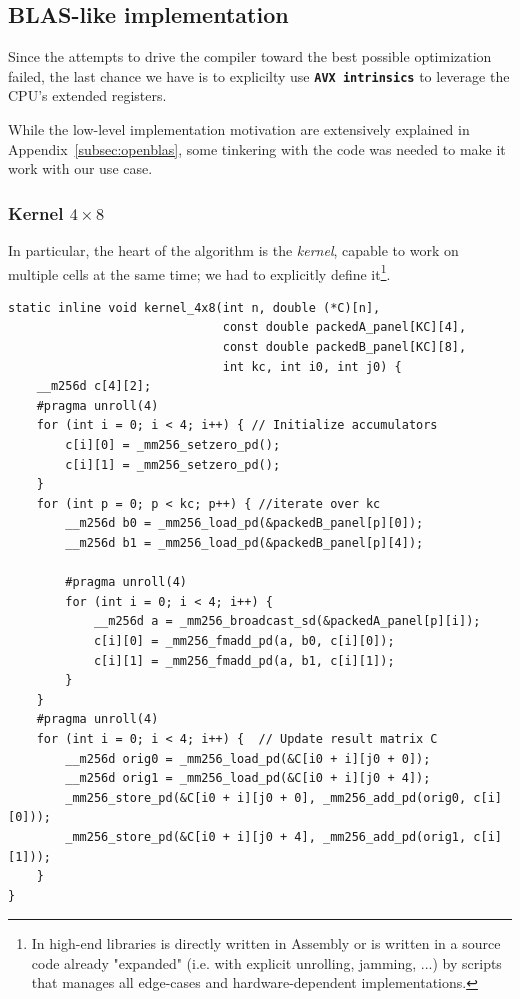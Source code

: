 \subsection{BLAS-like implementation}
Since the attempts to drive the compiler toward the best possible optimization failed, the last chance we have is to explicilty use \texttt{\textbf{AVX intrinsics}} to leverage the CPU's extended registers.

While the low-level implementation motivation are extensively explained in Appendix~\ref{subsec:openblas}, some tinkering with the code was needed to make it work with our use case. 

\subsubsection{Kernel $4\times8$}
In particular, the heart of the  algorithm is the \emph{kernel}, capable to work on multiple cells at the same time; we had to explicitly define it\footnote{In high-end libraries is directly written in Assembly or is written in a source code already "expanded" (i.e. with explicit unrolling, jamming, ...) by scripts that manages all edge-cases and hardware-dependent implementations.}.

\begin{lstlisting}[style=CStyle, caption={Kernel $4\times8$ doubles implementation},label={blas_like_code}]
static inline void kernel_4x8(int n, double (*C)[n], 
                              const double packedA_panel[KC][4], 
                              const double packedB_panel[KC][8], 
                              int kc, int i0, int j0) {
    __m256d c[4][2]; 
    #pragma unroll(4)
    for (int i = 0; i < 4; i++) { // Initialize accumulators
        c[i][0] = _mm256_setzero_pd();
        c[i][1] = _mm256_setzero_pd();
    }
    for (int p = 0; p < kc; p++) { //iterate over kc
        __m256d b0 = _mm256_load_pd(&packedB_panel[p][0]);
        __m256d b1 = _mm256_load_pd(&packedB_panel[p][4]);

        #pragma unroll(4)
        for (int i = 0; i < 4; i++) {
            __m256d a = _mm256_broadcast_sd(&packedA_panel[p][i]);
            c[i][0] = _mm256_fmadd_pd(a, b0, c[i][0]);
            c[i][1] = _mm256_fmadd_pd(a, b1, c[i][1]);
        }
    }
    #pragma unroll(4)
    for (int i = 0; i < 4; i++) {  // Update result matrix C
        __m256d orig0 = _mm256_load_pd(&C[i0 + i][j0 + 0]);
        __m256d orig1 = _mm256_load_pd(&C[i0 + i][j0 + 4]);
        _mm256_store_pd(&C[i0 + i][j0 + 0], _mm256_add_pd(orig0, c[i][0]));
        _mm256_store_pd(&C[i0 + i][j0 + 4], _mm256_add_pd(orig1, c[i][1]));
    }
}
\end{lstlisting}

